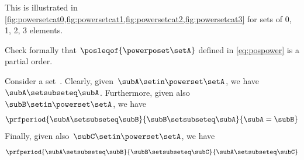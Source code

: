 This is illustrated in \cref{fig:powersetcat0,fig:powersetcat1,fig:powersetcat2,fig:powersetcat3} for sets of 0, 1, 2, 3 elements.
\begin{exercise}
    Check formally that $\posleqof{\powerposet\setA}$ defined in \cref{eq:pospower} is a partial order.
\end{exercise}
\begin{solution}
    Consider a set~\setA.
    Clearly, given~$\subA\setin \powerset \setA$, we have~$\subA\setsubseteq \subA$.
    Furthermore, given also~$\subB\setin \powerset \setA$, we have
    \begin{equation}\label{eq:ex-pospower-1}
        \prfperiod{
            \subA\setsubseteq \subB
        }{
            \subB\setsubseteq \subA
        }{
            \subA=\subB
        }
    \end{equation}
    Finally, given also~$\subC\setin \powerset \setA$, we have
    \begin{equation}\label{eq:ex-pospower-2}
        \prfperiod{
            \subA\setsubseteq \subB
        }{
            \subB\setsubseteq \subC
        }{
            \subA\setsubseteq\subC
        }
    \end{equation}
\end{solution}
